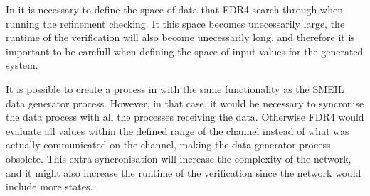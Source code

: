 In \cspm it is necessary to define the space of data that FDR4 search through when running the refinement checking. It this space becomes unecessarily large, the runtime of the verification will also become unecessarily long, and therefore it is important to be carefull when defining the space of input values for the generated system.

It is possible to create a process in \cspm with the same functionality as the SMEIL data generator process. However, in that case, it would be necessary to syncronise the data process with all the processes receiving the data. Otherwise FDR4 would evaluate all values within the defined range of the channel instead of what was actually communicated on the channel, making the data generator process obsolete. This extra syncronisation will increase the complexity of the \cspm{} network, and it might also increase the runtime of the verification since the \cspm{} network would include more states.

